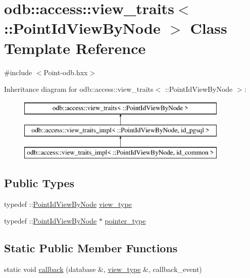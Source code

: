 \hypertarget{classodb_1_1access_1_1view__traits_3_01_1_1_point_id_view_by_node_01_4}{}\section{odb\+:\+:access\+:\+:view\+\_\+traits$<$ \+:\+:Point\+Id\+View\+By\+Node $>$ Class Template Reference}
\label{classodb_1_1access_1_1view__traits_3_01_1_1_point_id_view_by_node_01_4}


{\ttfamily \#include $<$Point-\/odb.\+hxx$>$}

Inheritance diagram for odb\+:\+:access\+:\+:view\+\_\+traits$<$ \+:\+:Point\+Id\+View\+By\+Node $>$\+:\begin{figure}[H]
\begin{center}
\leavevmode
\includegraphics[height=3.000000cm]{d4/d2f/classodb_1_1access_1_1view__traits_3_01_1_1_point_id_view_by_node_01_4}
\end{center}
\end{figure}
\subsection*{Public Types}
\begin{DoxyCompactItemize}
\item 
typedef \+::\hyperlink{struct_point_id_view_by_node}{Point\+Id\+View\+By\+Node} \hyperlink{classodb_1_1access_1_1view__traits_3_01_1_1_point_id_view_by_node_01_4_ac97bef0d1fd364108274046727e3da42}{view\+\_\+type}
\item 
typedef \+::\hyperlink{struct_point_id_view_by_node}{Point\+Id\+View\+By\+Node} $\ast$ \hyperlink{classodb_1_1access_1_1view__traits_3_01_1_1_point_id_view_by_node_01_4_a1666ac32df2e3e75da347ecebd39a596}{pointer\+\_\+type}
\end{DoxyCompactItemize}
\subsection*{Static Public Member Functions}
\begin{DoxyCompactItemize}
\item 
static void \hyperlink{classodb_1_1access_1_1view__traits_3_01_1_1_point_id_view_by_node_01_4_a4767b90abb465f7a3f7540bead94d3af}{callback} (database \&, \hyperlink{classodb_1_1access_1_1view__traits_3_01_1_1_point_id_view_by_node_01_4_ac97bef0d1fd364108274046727e3da42}{view\+\_\+type} \&, callback\+\_\+event)
\end{DoxyCompactItemize}


